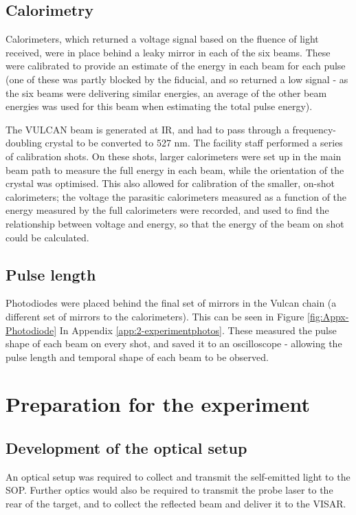 \subsection{Calorimetry}
Calorimeters, which returned a voltage signal based on the fluence of light received, were in place behind a leaky mirror in each of the six beams. These were calibrated to provide an estimate of the energy in each beam for each pulse (one of these was partly blocked by the fiducial, and so returned a low signal - as the six beams were delivering similar energies, an average of the other beam energies was used for this beam when estimating the total pulse energy).

The VULCAN beam is generated at IR, and had to pass through a frequency-doubling crystal to be converted to 527 \unit{\nano\meter}. The facility staff performed a series of calibration shots. On these shots, larger calorimeters were set up in the main beam path to measure the full energy in each beam, while the orientation of the crystal was optimised. This also allowed for calibration of the smaller, on-shot calorimeters; the voltage the parasitic calorimeters measured as a function of the energy measured by the full calorimeters were recorded, and used to find the relationship between voltage and energy, so that the energy of the beam on shot could be calculated.

\subsection{Pulse length}
Photodiodes were placed behind the final set of mirrors in the Vulcan chain (a different set of mirrors to the calorimeters). This can be seen in Figure \ref{fig:Appx-Photodiode} In Appendix \ref{app:2-experimentphotos}. These measured the pulse shape of each beam on every shot, and saved it to an oscilloscope - allowing the pulse length and temporal shape of each beam to be observed.

\section{Preparation for the experiment}

\subsection{Development of the optical setup}

An optical setup was required to collect and transmit the self-emitted light to the SOP. Further optics would also be required to transmit the probe laser to the rear of the target, and to collect the reflected beam and deliver it to the VISAR. 

